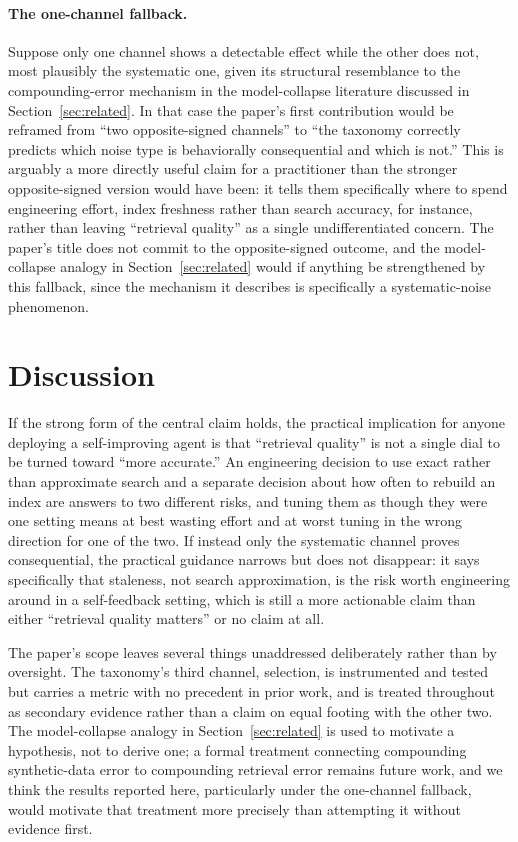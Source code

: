 \documentclass{article}
\begin{document}
\paragraph{The one-channel fallback.} Suppose only one channel shows a detectable effect while the other does not, most plausibly the systematic one, given its structural resemblance to the compounding-error mechanism in the model-collapse literature discussed in Section~\ref{sec:related}. In that case the paper's first contribution would be reframed from ``two opposite-signed channels'' to ``the taxonomy correctly predicts which noise type is behaviorally consequential and which is not.'' This is arguably a more directly useful claim for a practitioner than the stronger opposite-signed version would have been: it tells them specifically where to spend engineering effort, index freshness rather than search accuracy, for instance, rather than leaving ``retrieval quality'' as a single undifferentiated concern. The paper's title does not commit to the opposite-signed outcome, and the model-collapse analogy in Section~\ref{sec:related} would if anything be strengthened by this fallback, since the mechanism it describes is specifically a systematic-noise phenomenon.

\section{Discussion}
\label{sec:discussion}

If the strong form of the central claim holds, the practical implication for anyone deploying a self-improving agent is that ``retrieval quality'' is not a single dial to be turned toward ``more accurate.'' An engineering decision to use exact rather than approximate search and a separate decision about how often to rebuild an index are answers to two different risks, and tuning them as though they were one setting means at best wasting effort and at worst tuning in the wrong direction for one of the two. If instead only the systematic channel proves consequential, the practical guidance narrows but does not disappear: it says specifically that staleness, not search approximation, is the risk worth engineering around in a self-feedback setting, which is still a more actionable claim than either ``retrieval quality matters'' or no claim at all.

The paper's scope leaves several things unaddressed deliberately rather than by oversight. The taxonomy's third channel, selection, is instrumented and tested but carries a metric with no precedent in prior work, and is treated throughout as secondary evidence rather than a claim on equal footing with the other two. The model-collapse analogy in Section~\ref{sec:related} is used to motivate a hypothesis, not to derive one; a formal treatment connecting compounding synthetic-data error to compounding retrieval error remains future work, and we think the results reported here, particularly under the one-channel fallback, would motivate that treatment more precisely than attempting it without evidence first.
\end{document}
